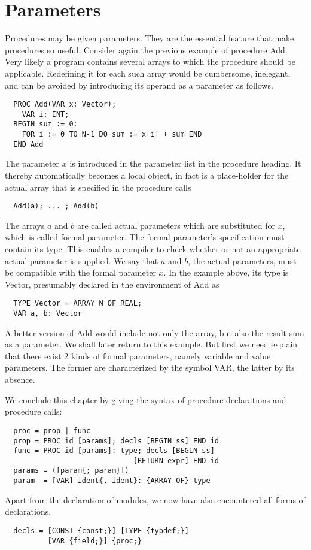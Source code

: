 \chapter{Parameters}
Procedures may be given parameters. They are the essential feature that make procedures so
useful. Consider again the previous example of procedure Add. Very likely a program contains
several arrays to which the procedure should be applicable. Redefining it for each such array would
be cumbersome, inelegant, and can be avoided by introducing its operand as a parameter as
follows.
\begin{verbatim}
  PROC Add(VAR x: Vector);
    VAR i: INT;
  BEGIN sum := 0:
    FOR i := 0 TO N-1 DO sum := x[i] + sum END
  END Add
\end{verbatim}
The parameter $x$ is introduced in the parameter list in the procedure heading. It thereby
automatically becomes a local object, in fact is a place-holder for the actual array that is
specified in the procedure calls
\begin{verbatim}
  Add(a); ... ; Add(b)
\end{verbatim}
The arrays $a$ and $b$ are called actual parameters which are substituted for $x$, which is called
formal parameter. The formal parameter's specification must contain its type. This enables a compiler
to check whether or not an appropriate actual parameter is supplied. We say that $a$ and $b$, the
actual parameters, must be compatible with the formal parameter $x$. In the example above, its type
is Vector, presumably declared in the environment of Add as
\begin{verbatim}
  TYPE Vector = ARRAY N OF REAL;
  VAR a, b: Vector
\end{verbatim}
A better version of Add would include not only the array, but also the result sum as a parameter.
We shall later return to this example. But first we need explain that there exist 2 kinds of formal
parameters, namely variable and value parameters. The former are characterized by the symbol
VAR, the latter by its absence.

We conclude this chapter by giving the syntax of procedure declarations and procedure calls:
\begin{verbatim}
  proc = prop | func
  prop = PROC id [params]; decls [BEGIN ss] END id
  func = PROC id [params]: type; decls [BEGIN ss]
                              [RETURN expr] END id
  params = ([param{; param}])
  param  = [VAR] ident{, ident}: {ARRAY OF} type
\end{verbatim}
Apart from the declaration of modules, we now have also encountered all forms of declarations.
\begin{verbatim}
  decls = [CONST {const;}] [TYPE {typdef;}]
          [VAR {field;}] {proc;}
\end{verbatim}

